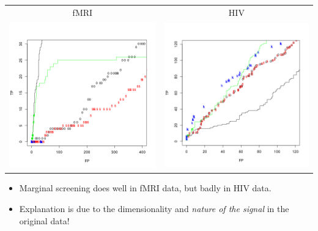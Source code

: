 \documentclass{beamer}
\begin{document}
\begin{frame}
\begin{center}
\begin{tabular}{cc}
fMRI & HIV\\
\includegraphics[scale = 0.25]{fMRI_tvf.png} & 
\includegraphics[scale = 0.25]{HIV_tvf.png}
\end{tabular}
\end{center}
\begin{itemize}
\item Marginal screening does well in fMRI data, but badly in HIV data.
\item Explanation is due to the dimensionality and \emph{nature of the signal} in the original data!
\end{itemize}
\end{frame}
\end{document}
